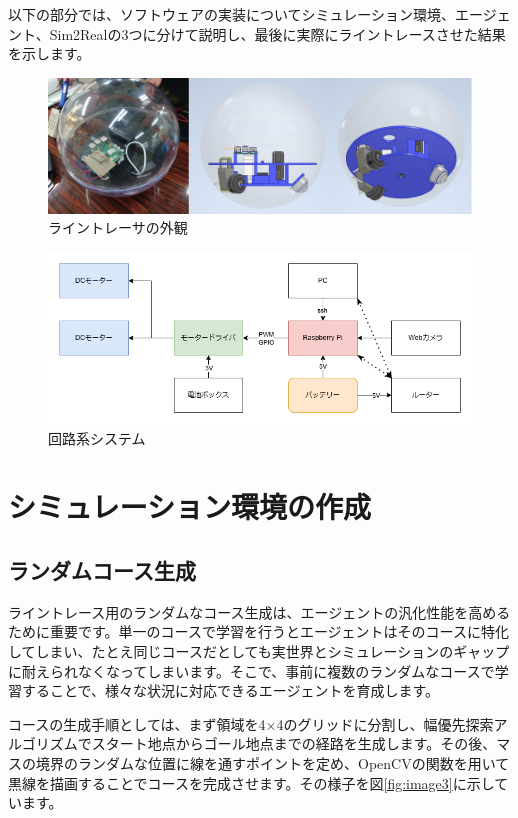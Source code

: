 以下の部分では、ソフトウェアの実装についてシミュレーション環境、エージェント、Sim2Realの3つに分けて説明し、最後に実際にライントレースさせた結果を示します。

\begin{figure}[h]
  \centering
  \includegraphics[width=1\hsize]{line-tracer/fig/image1.png}
  \caption{ライントレーサの外観}
  \label{fig:image1}
\end{figure}

\begin{figure}[h]
  \centering
  \includegraphics[width=1\hsize]{line-tracer/fig/image2.png}
  \caption{回路系システム}
  \label{fig:image2}
\end{figure}

\section{シミュレーション環境の作成}

\subsection{ランダムコース生成}
ライントレース用のランダムなコース生成は、エージェントの汎化性能を高めるために重要です。単一のコースで学習を行うとエージェントはそのコースに特化してしまい、たとえ同じコースだとしても実世界とシミュレーションのギャップに耐えられなくなってしまいます。そこで、事前に複数のランダムなコースで学習することで、様々な状況に対応できるエージェントを育成します。

コースの生成手順としては、まず領域を4×4のグリッドに分割し、幅優先探索アルゴリズムでスタート地点からゴール地点までの経路を生成します。その後、マスの境界のランダムな位置に線を通すポイントを定め、OpenCVの関数を用いて黒線を描画することでコースを完成させます。その様子を図\ref{fig:image3}に示しています。

